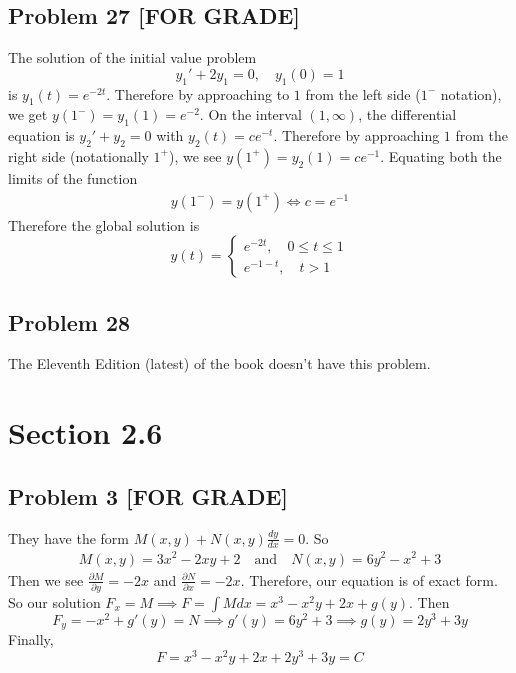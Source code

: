 \documentclass[12pt]{article}
\begin{document}
\subsection*{Problem 27 [FOR GRADE]}
\label{sec:org4242b51}
The solution of the initial value problem
\begin{equation*}
  y_1'+2y_1=0, \quad y_1(0) = 1
\end{equation*}
is \(y_1(t) = e^{-2t}\). Therefore by approaching to \(1\) from the left side
(\(1^-\) notation), we get \(y(1^-) = y_1(1) = e^{-2}\). On the interval \((1,
   \infty)\), the differential equation is \(y_2'+y_2=0\) with
\(y_2(t)=ce^{-t}\). Therefore by approaching \(1\) from the right side
(notationally \(1^+\)), we see \(y(1^+)=y_2(1)=ce^{-1}\). Equating both the
limits of the function
\begin{align*}
  y(1^-) = y(1^+) \iff c = e^{-1}
\end{align*}
Therefore the global solution is
\begin{equation*}
  y(t) = 
  \begin{cases}
    e^{-2t}, \quad 0 \leq t \leq 1\\
    e^{-1-t}, \quad t > 1
  \end{cases}
\end{equation*}

\subsection*{Problem 28}
\label{sec:org714f839}
The Eleventh Edition (latest) of the book doesn't have this problem.

\section*{Section 2.6}
\label{sec:orge2a6e6a}

\subsection*{Problem 3 [FOR GRADE]}
\label{sec:orgaac2640}
They have the form \(M(x,y) + N(x,y) \frac{dy}{dx} = 0\). So
\begin{align*}
  M(x,y) = 3x^2-2xy+2 \quad \text{and} \quad N(x,y) = 6y^2-x^2+3
\end{align*}
Then we see \(\frac{\partial M}{\partial y} = -2x\) and \(\frac{\partial
   N}{\partial x} = -2x\). Therefore, our equation is of exact form. So our
solution \(F_x = M \implies F = \int M dx = x^3 - x^2y + 2x + g(y)\).
Then
\begin{equation*}
F_y = -x^2+g'(y) = N \implies g'(y) = 6y^2+3 \implies g(y)=2y^3 + 3y
\end{equation*}
Finally,
\begin{equation*}
  F = x^3 - x^2y + 2x +2y^3 + 3y = C
\end{equation*}
\end{document}
